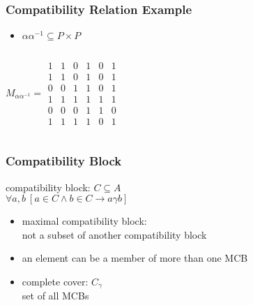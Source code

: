 \documentclass[dvipsnames]{beamer}
\begin{document}
\begin{frame}
  \frametitle{Compatibility Relation Example}

  \begin{itemize}
   \item $\alpha \alpha^{-1} \subseteq P \times P$
  \end{itemize}

  \begin{columns}
    \[
      M_{\alpha \alpha^{-1}} =
        \begin{array}{|cccccc|}
          1  &  1  &  0  &  1  &  0  &  1\\
          1  &  1  &  0  &  1  &  0  &  1\\
          0  &  0  &  1  &  1  &  0  &  1\\
          1  &  1  &  1  &  1  &  1  &  1\\
          0  &  0  &  0  &  1  &  1  &  0\\
          1  &  1  &  1  &  1  &  0  &  1
        \end{array}
    \]

    \begin{center}
    \end{center}
  \end{columns}
\end{frame}

\begin{frame}
  \frametitle{Compatibility Block}

  \begin{definition}
    \alert{compatibility block}: $C \subseteq A$\\
      $\forall a,b~[a \in C \wedge b \in C \rightarrow a \gamma b]$
  \end{definition}

  \pause
  \medskip
  \begin{itemize}
    \item \alert{maximal compatibility block}:\\
      not a subset of another compatibility block
    \item an element can be a member of more than one MCB

    \pause
    \medskip
    \item \alert{complete cover}: $C_\gamma$\\
      set of all MCBs
  \end{itemize}
\end{frame}
\end{document}

